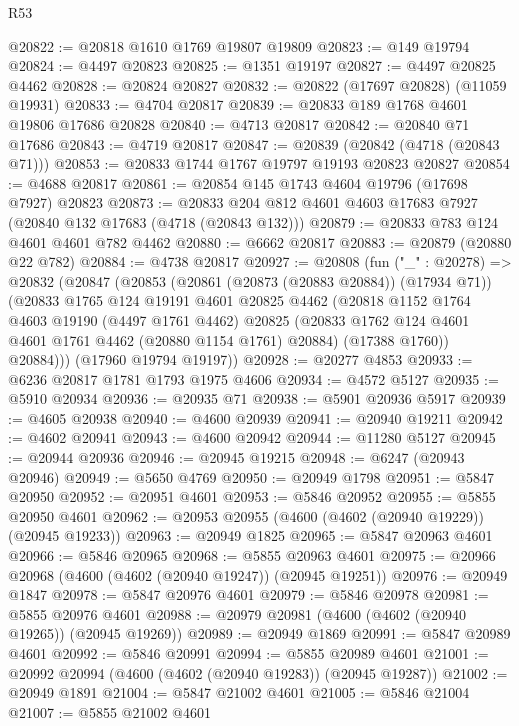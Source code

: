 \begin{lexlean}{R53}
\begin{coremodule}
@20822 := @20818 @1610 @1769 @19807 @19809
@20823 := @149 @19794
@20824 := @4497 @20823
@20825 := @1351 @19197
@20827 := @4497 @20825 @4462
@20828 := @20824 @20827
@20832 := @20822 (@17697 @20828) (@11059 @19931)
@20833 := @4704 @20817
@20839 := @20833 @189 @1768 @4601 @19806 @17686 @20828
@20840 := @4713 @20817
@20842 := @20840 @71 @17686
@20843 := @4719 @20817
@20847 := @20839 (@20842 (@4718 (@20843 @71)))
@20853 := @20833 @1744 @1767 @19797 @19193 @20823 @20827
@20854 := @4688 @20817
@20861 := @20854 @145 @1743 @4604 @19796 (@17698 @7927) @20823
@20873 := @20833 @204 @812 @4601 @4603 @17683 @7927 (@20840 @132 @17683 (@4718 (@20843 @132)))
@20879 := @20833 @783 @124 @4601 @4601 @782 @4462
@20880 := @6662 @20817
@20883 := @20879 (@20880 @22 @782)
@20884 := @4738 @20817
@20927 := @20808
    (fun ("_" : @20278) =>
    @20832
      (@20847
        (@20853
          (@20861 (@20873 (@20883 @20884)) (@17934 @71))
          (@20833
            @1765
            @124
            @19191
            @4601
            @20825
            @4462
            (@20818
              @1152
              @1764
              @4603
              @19190
              (@4497 @1761 @4462)
              @20825
              (@20833 @1762 @124 @4601 @4601 @1761 @4462 (@20880 @1154 @1761) @20884)
              (@17388 @1760))
            @20884)))
      (@17960 @19794 @19197))
@20928 := @20277 @4853
@20933 := @6236 @20817 @1781 @1793 @1975 @4606
@20934 := @4572 @5127
@20935 := @5910 @20934
@20936 := @20935 @71
@20938 := @5901 @20936 @5917
@20939 := @4605 @20938
@20940 := @4600 @20939
@20941 := @20940 @19211
@20942 := @4602 @20941
@20943 := @4600 @20942
@20944 := @11280 @5127
@20945 := @20944 @20936
@20946 := @20945 @19215
@20948 := @6247 (@20943 @20946)
@20949 := @5650 @4769
@20950 := @20949 @1798
@20951 := @5847 @20950
@20952 := @20951 @4601
@20953 := @5846 @20952
@20955 := @5855 @20950 @4601
@20962 := @20953 @20955 (@4600 (@4602 (@20940 @19229)) (@20945 @19233))
@20963 := @20949 @1825
@20965 := @5847 @20963 @4601
@20966 := @5846 @20965
@20968 := @5855 @20963 @4601
@20975 := @20966 @20968 (@4600 (@4602 (@20940 @19247)) (@20945 @19251))
@20976 := @20949 @1847
@20978 := @5847 @20976 @4601
@20979 := @5846 @20978
@20981 := @5855 @20976 @4601
@20988 := @20979 @20981 (@4600 (@4602 (@20940 @19265)) (@20945 @19269))
@20989 := @20949 @1869
@20991 := @5847 @20989 @4601
@20992 := @5846 @20991
@20994 := @5855 @20989 @4601
@21001 := @20992 @20994 (@4600 (@4602 (@20940 @19283)) (@20945 @19287))
@21002 := @20949 @1891
@21004 := @5847 @21002 @4601
@21005 := @5846 @21004
@21007 := @5855 @21002 @4601

\end{coremodule}
\end{lexlean}
